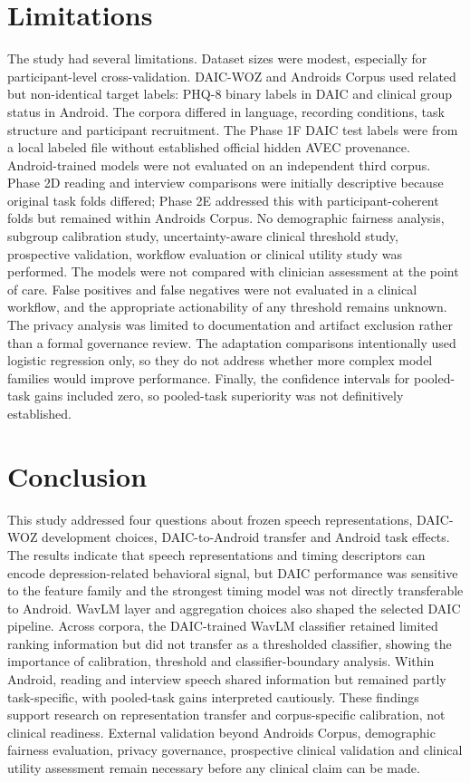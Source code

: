 \documentclass[lettersize,journal]{IEEEtran}
\begin{document}
\section{Limitations}

The study had several limitations. Dataset sizes were modest, especially for participant-level cross-validation. DAIC-WOZ and Androids Corpus used related but non-identical target labels: PHQ-8 binary labels in DAIC and clinical group status in Android. The corpora differed in language, recording conditions, task structure and participant recruitment. The Phase 1F DAIC test labels were from a local labeled file without established official hidden AVEC provenance. Android-trained models were not evaluated on an independent third corpus. Phase 2D reading and interview comparisons were initially descriptive because original task folds differed; Phase 2E addressed this with participant-coherent folds but remained within Androids Corpus. No demographic fairness analysis, subgroup calibration study, uncertainty-aware clinical threshold study, prospective validation, workflow evaluation or clinical utility study was performed. The models were not compared with clinician assessment at the point of care. False positives and false negatives were not evaluated in a clinical workflow, and the appropriate actionability of any threshold remains unknown. The privacy analysis was limited to documentation and artifact exclusion rather than a formal governance review. The adaptation comparisons intentionally used logistic regression only, so they do not address whether more complex model families would improve performance. Finally, the confidence intervals for pooled-task gains included zero, so pooled-task superiority was not definitively established.

\section{Conclusion}

This study addressed four questions about frozen speech representations, DAIC-WOZ development choices, DAIC-to-Android transfer and Android task effects. The results indicate that speech representations and timing descriptors can encode depression-related behavioral signal, but DAIC performance was sensitive to the feature family and the strongest timing model was not directly transferable to Android. WavLM layer and aggregation choices also shaped the selected DAIC pipeline. Across corpora, the DAIC-trained WavLM classifier retained limited ranking information but did not transfer as a thresholded classifier, showing the importance of calibration, threshold and classifier-boundary analysis. Within Android, reading and interview speech shared information but remained partly task-specific, with pooled-task gains interpreted cautiously. These findings support research on representation transfer and corpus-specific calibration, not clinical readiness. External validation beyond Androids Corpus, demographic fairness evaluation, privacy governance, prospective clinical validation and clinical utility assessment remain necessary before any clinical claim can be made.
\end{document}
